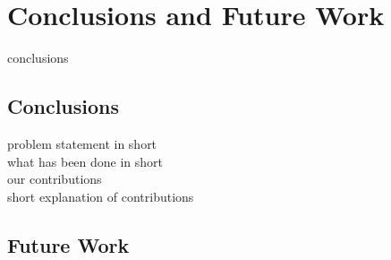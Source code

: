 \chapter{Conclusions and Future Work} \label{chap:concFuture}

conclusions

\section{Conclusions} \label{sec:concFuture-conc}

problem statement in short\\
what has been done in short\\
our contributions\\
short explanation of contributions 

\section{Future Work} \label{sec:concFuture-future}